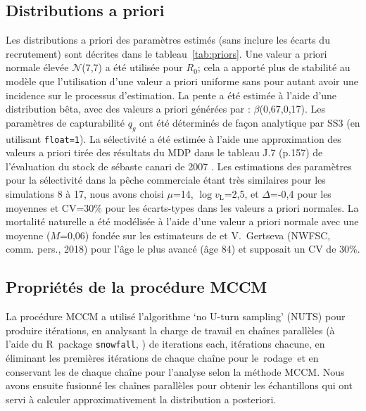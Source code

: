 \documentclass[11pt]{book}
\newcommand{\Norm}{\mathcal{N}}%
\newcommand{\pc}{\%}
\newcommand{\angL}{\guillemotleft\,}
\newcommand{\angR}{\,\guillemotright}
\newcommand{\code}[1]{\normalsize\texttt{#1}\normalsize}%
\begin{document}
\subsection{Distributions a priori}

Les distributions a priori des param\`{e}tres estim\'{e}s (sans inclure les \'{e}carts du recrutement) sont d\'{e}crites dans le tableau~\ref{tab:priors}.
Une valeur a priori normale \'{e}lev\'{e}e $\Norm$(7,7) a \'{e}t\'{e} utilis\'{e}e pour $R_0$; cela a apport\'{e} plus de stabilit\'{e} au mod\`{e}le que l'utilisation d'une valeur a priori uniforme sans pour autant avoir une incidence sur le processus d'estimation.
La pente a \'{e}t\'{e} estim\'{e}e \`{a} l'aide d'une distribution b\^{e}ta, avec des valeurs a priori g\'{e}n\'{e}r\'{e}es par \citet{Forrest-etal:2010}: $\beta$(0,67,0,17).
Les param\`{e}tres de capturabilit\'{e} $q_g$ ont \'{e}t\'{e} d\'{e}termin\'{e}s de fa\c{c}on analytique par SS3 (en utilisant \code{float=1}).
La s\'{e}lectivit\'{e} a \'{e}t\'{e} estim\'{e}e \`{a} l'aide une approximation des valeurs a priori tir\'{e}e des r\'{e}sultats du MDP dans le tableau J.7 (p.157) de l'\'{e}valuation du stock de s\'{e}baste canari de 2007 \citep{Stanley-etal:2009_car}.
Les estimations des param\`{e}tres pour la s\'{e}lectivit\'{e} dans la p\^{e}che commerciale \'{e}tant tr\`{e}s similaires pour les simulations 8 \`{a} 17, nous avons choisi $\mu$=14, $\log v_\text{L}$=2,5, et $\Delta$=-0,4 pour les moyennes et CV=30\pc{} pour les \'{e}carts-types dans les valeurs a priori normales.
La mortalit\'{e} naturelle a \'{e}t\'{e} mod\'{e}lis\'{e}e \`{a} l'aide d'une valeur a priori normale avec une moyenne ($M$=0,06) fond\'{e}e sur les estimateurs de \citet{Hoenig:1983} et V.~Gertseva (NWFSC, comm. pers., 2018) pour l'\^{a}ge le plus avanc\'{e} (\^{a}ge 84) et supposait un CV de 30\pc{}.

\subsection{Propri\'{e}t\'{e}s de la proc\'{e}dure MCCM}

La proc\'{e}dure MCCM a utilis\'{e} l'algorithme `no U-turn sampling' (NUTS) \citep{Monnahan-Kristensen:2018, Monnahan-etal:2019} pour produire \nSims{} it\'{e}rations, en analysant la charge de travail en \nChains{} cha\^{i}nes parall\`{e}les (\`{a} l'aide du R~package \code{snowfall}, \citealt{R:2015_snowfall}) de \cSims{} iterations each, it\'{e}rations chacune, en \'{e}liminant les \cBurn{} premi\`{e}res it\'{e}rations de chaque cha\^{i}ne pour le \angL{}rodage\angR{} et en conservant les \cSamps{} de chaque cha\^{i}ne pour l'analyse selon la m\'{e}thode MCCM.
Nous avons ensuite fusionn\'{e} les cha\^{i}nes parall\`{e}les pour obtenir les \Nmcmc{} \'{e}chantillons qui ont servi \`{a} calculer approximativement la distribution a posteriori.
\end{document}
